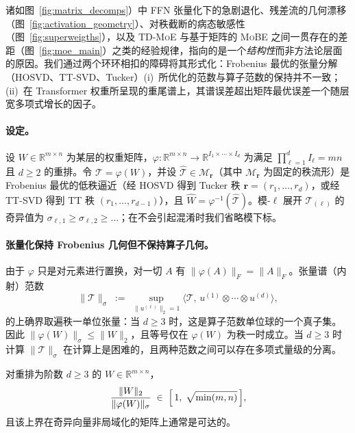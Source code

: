 诸如图~\ref{fig:matrix_decomps}）中 FFN 张量化下的急剧退化、残差流的几何漂移（图~\ref{fig:activation_geometry}）、对秩截断的病态敏感性（图~\ref{fig:superweigths}），以及 \textsc{TD-MoE} 与基于矩阵的 \textsc{MoBE} 之间一贯存在的差距（图~\ref{fig:moe_main}）之类的经验规律，指向的是一个\textit{结构性}而非方法论层面的原因。我们通过两个环环相扣的障碍将其形式化：Frobenius 最优的张量分解（HOSVD、TT-SVD、Tucker）(i)~所优化的范数与算子范数的保持并不一致；(ii)~在 Transformer 权重所呈现的重尾谱上，其谱误差超出矩阵最优误差一个随层宽多项式增长的因子。

\paragraph{设定。}
设 $W \in \mathbb{R}^{m \times n}$ 为某层的权重矩阵，$\varphi : \mathbb{R}^{m \times n} \to \mathbb{R}^{I_1 \times \cdots \times I_d}$ 为满足 $\prod \limits_{\ell = 1}^d I_\ell = mn$ 且 $d \geq 2$ 的重排。令 $\mathcal{T} = \varphi(W)$，并设 $\widehat{\mathcal{T}} \in \mathcal{M}_{\mathbf{r}}$（其中 $\mathcal{M}_{\mathbf{r}}$ 为固定的秩流形）是 Frobenius 最优的低秩逼近（经 HOSVD 得到 Tucker 秩 $\mathbf{r}=(r_1,\dots,r_d)$，或经 TT-SVD 得到 TT 秩 $(r_1,\dots,r_{d-1})$），且 $\widehat{W} = \varphi^{-1}(\widehat{\mathcal{T}})$。模-$\ell$ 展开 $\mathcal{T}_{(\ell)}$ 的奇异值为 $\sigma_{\ell,1} \geq \sigma_{\ell,2} \geq \dots$；在不会引起混淆时我们省略模下标。

\paragraph{张量化保持 Frobenius 几何但不保持算子几何。} 由于 $\varphi$ 只是对元素进行置换，对一切 $A$ 有 $\|\varphi(A)\|_F = \|A\|_F$。张量谱（内射）范数
\begin{equation}
\|\mathcal{T}\|_\sigma \;:=\; \sup_{\|u^{(\ell)}\|_2 = 1} \bigl\langle \mathcal{T},\, u^{(1)} \otimes \cdots \otimes u^{(d)} \bigr\rangle,
\label{eq:tensor-spectral}
\end{equation}
的上确界取遍秩一单位张量：当 $d \geq 3$ 时，这是算子范数单位球的一个真子集。因此 $\|\varphi(W)\|_\sigma \leq \|W\|_2$，且等号仅在 $\varphi(W)$ 为秩一时成立。当 $d \geq 3$ 时计算 $\|\mathcal{T}\|_\sigma$ 在计算上是困难的，且两种范数之间可以存在多项式量级的分离。

\begin{proposition} 
\label{prop:gap}
对重排为阶数 $d \geq 3$ 的 $W \in \mathbb{R}^{m \times n}$，
\begin{equation}
\frac{\|W\|_2}{\|\varphi(W)\|_\sigma} \;\in\; \Bigl[\,1,\; \sqrt{\min(m,n)}\,\Bigr],
\label{eq:gap-bound}
\end{equation}
且该上界在奇异向量非局域化的矩阵上通常是可达的。
\end{proposition}

